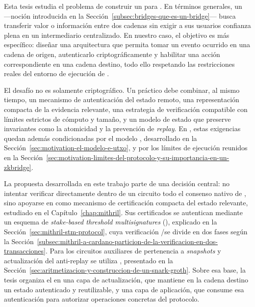 Esta tesis estudia el problema de construir un \zkBridge para \Cardano. En términos generales, un \Bridge ---noción introducida en la Sección~\ref{subsec:bridges-que-es-un-bridge}--- busca transferir valor o información entre dos cadenas sin exigir a sus usuarios confianza plena en un intermediario centralizado. En nuestro caso, el objetivo es más específico: diseñar una arquitectura que permita tomar un evento ocurrido en una cadena de origen, autenticarlo criptográficamente y habilitar una acción correspondiente en una cadena destino, todo ello respetando las restricciones reales del entorno de ejecución de \Cardano.

El desafío no es solamente criptográfico. Un \zkBridge práctico debe combinar, al mismo tiempo, un mecanismo de autenticación del estado remoto, una representación compacta de la evidencia relevante, una estrategia de verificación \Onchain compatible con límites estrictos de cómputo y tamaño, y un modelo de estado que preserve invariantes como la atomicidad y la prevención de \textit{replay}. En \Cardano, estas exigencias quedan además condicionadas por el modelo \eUTxO, desarrollado en la Sección~\ref{sec:motivation-el-modelo-e-utxo}, y por los límites de ejecución reunidos en la Sección~\ref{sec:motivation-limites-del-protocolo-y-su-importancia-en-un-zkbridge}.

La propuesta desarrollada en este trabajo parte de una decisión central: no intentar verificar directamente dentro de un circuito \ZK todo el consenso nativo de \Cardano, sino apoyarse en \Mithril como mecanismo de certificación compacta del estado relevante, estudiado en el Capítulo~\ref{chap:mithril}. Sus certificados se autentican mediante un esquema de \textit{stake-based threshold multisignatures} (\STM), explicado en la Sección~\ref{sec:mithril-stm-protocol}, cuya verificación \HaloTwo/\Midnight se divide en dos fases según la Sección~\ref{subsec:mithril-a-cardano-particion-de-la-verificacion-en-dos-transacciones}. Para los circuitos auxiliares de pertenencia a \textit{snapshots} y actualización del \SMT anti-replay se utiliza \Groth, presentado en la Sección~\ref{sec:aritmetizacion-y-construccion-de-un-snark-groth}. Sobre esa base, la tesis organiza el \zkBridge en una capa de actualización, que mantiene en la cadena destino un estado autenticado y reutilizable, y una capa de aplicación, que consume esa autenticación para autorizar operaciones concretas del protocolo.

